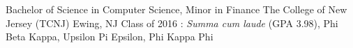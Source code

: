 

\begin{cventries}

  \cventry
    {Bachelor of Science in Computer Science, Minor in Finance} %
    {The College of New Jersey (TCNJ)} %
    {Ewing, NJ} %
    {Class of 2016} %
    {: \emph{Summa cum laude} (GPA 3.98), Phi Beta Kappa, Upsilon Pi Epsilon, Phi Kappa Phi}

\end{cventries}
